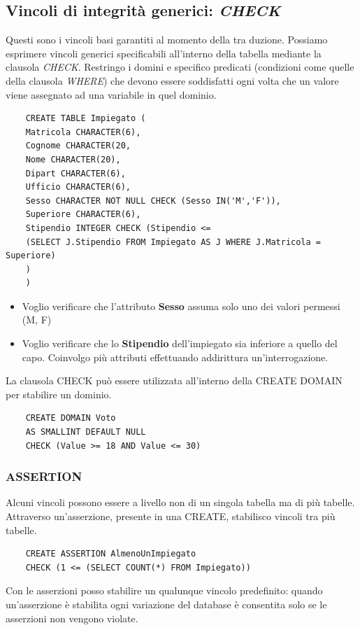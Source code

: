 \subsection{Vincoli di integrità generici: \emph{CHECK}}
Questi sono i vincoli basi garantiti al momento della tra duzione. Possiamo esprimere vincoli generici specificabili all'interno della tabella mediante la clausola \emph{CHECK}. Restringo i domini e specifico predicati (condizioni come quelle della clausola \emph{WHERE}) che devono essere soddisfatti ogni volta che un valore viene assegnato ad una variabile in quel dominio.
\begin{verbatim}
	CREATE TABLE Impiegato (
	Matricola CHARACTER(6),
	Cognome CHARACTER(20,
	Nome CHARACTER(20),
	Dipart CHARACTER(6),
	Ufficio CHARACTER(6),
	Sesso CHARACTER NOT NULL CHECK (Sesso IN('M','F')),
	Superiore CHARACTER(6),
	Stipendio INTEGER CHECK (Stipendio <= 
	(SELECT J.Stipendio FROM Impiegato AS J WHERE J.Matricola = Superiore)
	)
	)
\end{verbatim}
\begin{itemize}
	\item Voglio verificare che l'attributo \textbf{Sesso} assuma solo uno dei valori permessi (M, F)
	\item Voglio verificare che lo \textbf{Stipendio} dell'impiegato sia inferiore a quello del capo. Coinvolgo più attributi effettuando addirittura un'interrogazione.
\end{itemize}
La clausola CHECK può essere utilizzata all'interno della CREATE DOMAIN per stabilire un dominio.
\begin{verbatim}
	CREATE DOMAIN Voto 
	AS SMALLINT DEFAULT NULL
	CHECK (Value >= 18 AND Value <= 30)
\end{verbatim}
\subsubsection{ASSERTION}
Alcuni vincoli possono essere a livello non di un singola tabella ma di più tabelle. Attraverso un'asserzione, presente in una CREATE, stabilisco vincoli tra più tabelle.
\begin{verbatim}
	CREATE ASSERTION AlmenoUnImpiegato
	CHECK (1 <= (SELECT COUNT(*) FROM Impiegato))
\end{verbatim}
Con le asserzioni posso stabilire un qualunque vincolo predefinito: quando un'asserzione è stabilita ogni variazione del database è consentita solo se le asserzioni non vengono violate.
